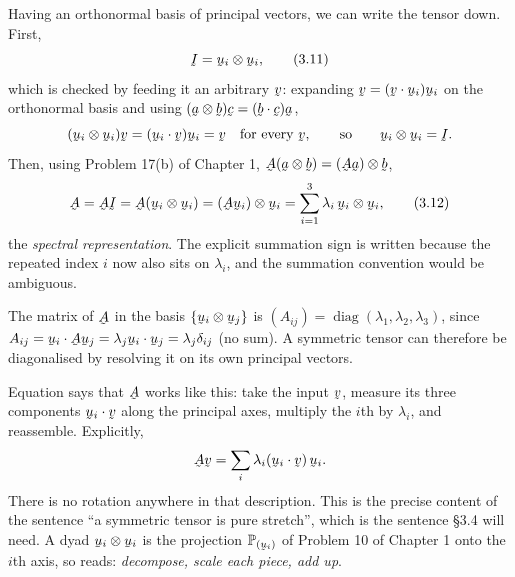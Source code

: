 Having an orthonormal basis of principal vectors, we can write the tensor
down. First,
\begin{equation}
   \I=\bu_{i}\otimes\bu_{i},
   \tag{3.11}\label{eq:3.11}
\end{equation}
which is checked by feeding it an arbitrary $\bv$: expanding
$\bv=(\ip{\bv}{\bu_{i}})\bu_{i}$ on the orthonormal basis and using
$(\ba\otimes\bb)\bc=(\ip\bb\bc)\ba$,
\[
   (\bu_{i}\otimes\bu_{i})\bv=(\ip{\bu_{i}}{\bv})\bu_{i}=\bv
   \quad\text{for every }\bv,\qquad\text{so}\qquad
   \bu_{i}\otimes\bu_{i}=\I .
\]
Then, using Problem 17(b) of Chapter 1, $\bA(\ba\otimes\bb)
=(\bA\ba)\otimes\bb$,
\begin{equation}
   \bA=\bA\I=\bA(\bu_{i}\otimes\bu_{i})=(\bA\bu_{i})\otimes\bu_{i}
     =\sum_{i=1}^{3}\lambda_{i}\,\bu_{i}\otimes\bu_{i},
   \tag{3.12}\label{eq:3.12}
\end{equation}
the \emph{spectral representation}. The explicit summation sign is written
because the repeated index $i$ now also sits on $\lambda_{i}$, and the
summation convention would be ambiguous.

The matrix of $\bA$ in the basis $\{\bu_{i}\otimes\bu_{j}\}$ is
$(A_{ij})=\operatorname{diag}(\lambda_{1},\lambda_{2},\lambda_{3})$, since
$A_{ij}=\ip{\bu_{i}}{\bA\bu_{j}}=\lambda_{j}\ip{\bu_{i}}{\bu_{j}}
=\lambda_{j}\dd_{ij}$ (no sum). A symmetric tensor can therefore be
diagonalised by resolving it on its own principal vectors.

\begin{remark}\label{rem:machine}
Equation  says that $\bA$ works like this: take the input $\bv$,
measure its three components $\ip{\bu_{i}}{\bv}$ along the principal axes,
multiply the $i$th by $\lambda_{i}$, and reassemble. Explicitly,
\[
   \bA\bv=\sum_{i}\lambda_{i}(\ip{\bu_{i}}{\bv})\,\bu_{i}.
\]
There is no rotation anywhere in that description. This is the precise
content of the sentence ``a symmetric tensor is pure stretch'', which is
the sentence \S3.4 will need. A dyad $\bu_{i}\otimes\bu_{i}$ is the
projection $\Proj{\bu_{i}}$ of Problem 10 of Chapter 1 onto the $i$th axis,
so  reads: \emph{decompose, scale each piece, add up}.
\end{remark}

